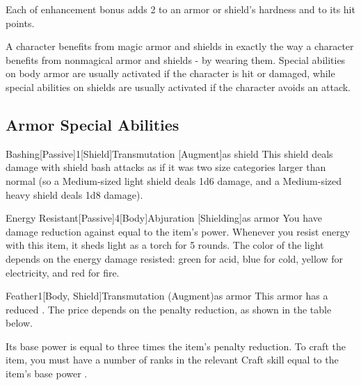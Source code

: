              Each  of enhancement bonus adds 2 to an armor or shield's hardness and  to its hit points.

             A character benefits from magic armor and shields in exactly the way a character benefits from nonmagical armor and shields - by wearing them.
            Special abilities on body armor are usually activated if the character is hit or damaged, while special abilities on shields are usually activated if the character avoids an attack.

    \subsection{Armor Special Abilities}\label{Armor Special Abilities}

        \begin{magicitemdef}{Bashing}[Passive]{1}[Shield]{Transmutation [Augment]}{as shield}
             This shield deals damage with shield bash attacks as if it was two size categories larger than normal (so a Medium-sized light shield deals 1d6 damage, and a Medium-sized heavy shield deals 1d8 damage).
        \end{magicitemdef}

        \begin{magicitemdef}{Energy Resistant}[Passive]{4}[Body]{Abjuration [Shielding]}{as armor}
             You have damage reduction against  equal to the item's power.
            Whenever you resist energy with this item, it sheds light as a torch for 5 rounds.
            The color of the light depends on the energy damage resisted: green for acid, blue for cold, yellow for electricity, and red for fire.
        \end{magicitemdef}

        \begin{magicitemdef}{Feather}{1}[Body, Shield]{Transmutation (Augment)}{as armor}
             This armor has a reduced .
            The price depends on the penalty reduction, as shown in the table below.

            Its base power is equal to three times the item's penalty reduction.
            To craft the item, you must have a number of ranks in the relevant Craft skill equal to the item's base power .
        \end{magicitemdef}

